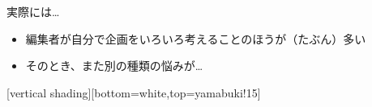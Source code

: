 \documentclass[14pt,dvipdfmx,uplatex]{beamer}
\begin{document}







\begin{frame}[t]{\inhibitglue 実際には…}
  \sffamily
  \begin{itemize}
    \item 編集者が自分で企画をいろいろ考えることのほうが（たぶん）多い
    \item そのとき、また別の種類の悩みが…
  \end{itemize}
\end{frame}

[vertical shading][bottom=white,top=yamabuki!15]
\end{document}
